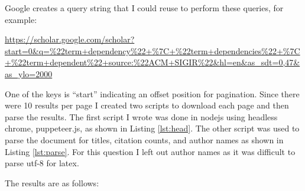 \documentclass[letterpaper,11pt]{article}
\begin{document}
Google creates a query string that I could reuse to perform these queries, for example:

\url{https://scholar.google.com/scholar?start=0&q=\%22term+dependency\%22+\%7C+\%22term+dependencies\%22+\%7C+\%22term+dependent\%22+source:\%22ACM+SIGIR\%22&hl=en&as_sdt=0,47&as_ylo=2000}

One of the keys is ``start'' indicating an offset position for pagination.
Since there were 10 results per page I created two scripts to download each page and then parse the results.
The first script I wrote was done in nodejs using headless chrome, puppeteer.js, as shown in Listing \ref{lst:head}.
The other script was used to parse the document for titles, citation counts, and author names as shown in Listing \ref{lst:parse}.
For this question I left out author names as it was difficult to parse utf-8 for latex.

The results are as follows:
\end{document}

